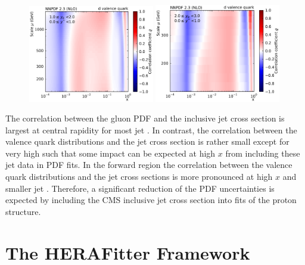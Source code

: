 \begin{figure}[p]
  \includegraphics[width=0.49\textwidth]{figures/pdf_constraints/corr_PTMAXEXPYS_YBYS_NLO_FINALBINS_NNPDF23_d_valence_quark_ys0_0yb0_0_cl.pdf}\hfill%
  \includegraphics[width=0.49\textwidth]{figures/pdf_constraints/corr_PTMAXEXPYS_YBYS_NLO_FINALBINS_NNPDF23_d_valence_quark_ys0_0yb2_0_cl.pdf}
  \label{fig:correlation_pdf_xs_gqq}
\end{figure}

The correlation between the gluon PDF and the inclusive jet cross
section is largest at central rapidity for most jet \pt. In contrast,
the correlation between the valence quark distributions and the jet
cross section is rather small except for very high \pt such that some
impact can be expected at high $x$ from including these jet data in
PDF fits. In the forward region the correlation between the valence
quark distributions and the jet cross sections is more pronounced at
high $x$ and smaller jet \pt. Therefore, a significant reduction of
the PDF uncertainties is expected by including the CMS inclusive jet
cross section into fits of the proton structure.

\section{The HERAFitter Framework}
\label{section:herafittersetup}

